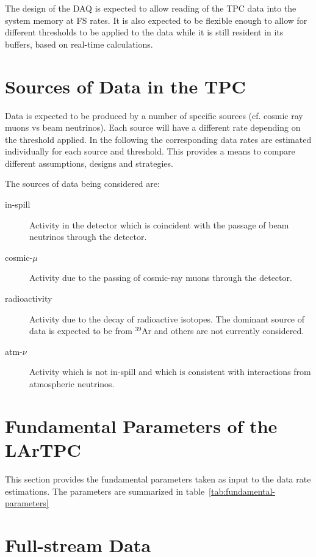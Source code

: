The design of the DAQ is expected to allow reading of the TPC data into the system memory at  FS rates.
It is also expected to be flexible enough to allow for different
thresholds to be applied to the data while it is still resident in its buffers, based on real-time calculations.

\section{Sources of Data in the TPC}

Data is expected to be produced by a number of specific sources (cf. cosmic ray muons vs beam neutrinos).
Each source will have a different rate depending on the threshold applied.
In the following the corresponding data rates are estimated individually for each source and threshold.
This provides a means to compare different assumptions, designs and strategies.

The sources of data being considered are:

\begin{description}
\item[in-spill] Activity in the detector which is coincident with the passage of beam neutrinos through the detector.
\item[cosmic-$\mu$] Activity due to the  passing of cosmic-ray muons through the detector.
\item[radioactivity] Activity due to the decay of radioactive
  isotopes.
  The dominant source of data is expected to be from $^{39}$Ar and
  others are not currently considered.
\item[atm-$\nu$] Activity which is not in-spill and which is
  consistent with interactions from atmospheric neutrinos.
\end{description}

\section{Fundamental Parameters of the LArTPC}

This section provides the fundamental parameters taken as input to the
data rate estimations.
The parameters are summarized in
table~\ref{tab:fundamental-parameters}



\section{Full-stream Data}

